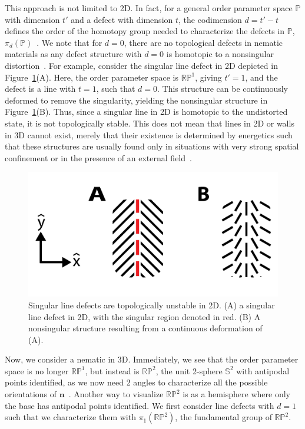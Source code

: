 This approach is not limited to 2D.
In fact, for a general order parameter space $\mathbb{P}$ with dimension $t'$ and a defect with dimension $t$, the codimension $d = t'-t$ defines the order of the homotopy group needed to characterize the defects in $\mathbb{P}$, $\pi_{d}(\mathbb{P})$~\cite{RN236}.
We note that for $d=0$, there are no topological defects in nematic materials as any defect structure with $d=0$ is homotopic to a nonsingular distortion~\cite{RN196}. For example, consider the singular line defect in 2D depicted in Figure~\ref{f:2-Smearing}(A).
Here, the order parameter space is $\mathbb{R}\mathbb{P}^1$, giving $t' = 1$, and the defect is a line with $t = 1$, such that $d = 0$.
This structure can be continuously deformed to remove the singularity, yielding the nonsingular structure in Figure~\ref{f:2-Smearing}(B).
Thus, since a singular line in 2D is homotopic to the undistorted state, it is not topologically stable.
This does not mean that lines in 2D or walls in 3D cannot exist, merely that their existence is determined by energetics such that these structures are usually found only in situations with very strong spatial confinement or in the presence of an external field~\cite{RN33,RN175}.\\
\begin{figure}[h]
  \centering
  \includegraphics{figures/C2/Ch2-Figs_Smearing.png}
  \caption{Singular line defects are topologically unstable in 2D.
  (A) a singular line defect in 2D, with the singular region denoted in red.
  (B) A nonsingular structure resulting from a continuous deformation of (A).}\label{f:2-Smearing}
\end{figure}

Now, we consider a nematic in 3D.
Immediately, we see that the order parameter space is no longer $\mathbb{R}\mathbb{P}^1$, but instead is $\mathbb{R}\mathbb{P}^2$, the unit 2-sphere $\mathbb{S}^2$ with antipodal points identified, as we now need 2 angles to characterize all the possible orientations of $\mathbf{n}$~\cite{RN196,RN153,RN236}.
Another way to visualize $\mathbb{R}\mathbb{P}^2$ is as a hemisphere where only the base has antipodal points identified.
We first consider line defects with $d=1$ such that we characterize them with $\pi_{1}(\mathbb{R}\mathbb{P}^2)$, the fundamental group of $\mathbb{R}\mathbb{P}^2$.

